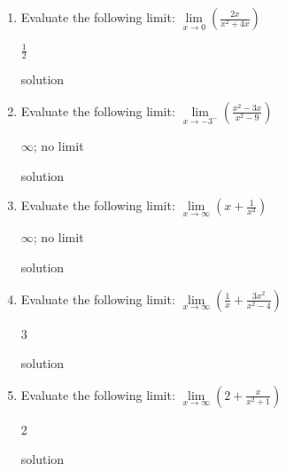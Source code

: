 \begin{enumerate}[leftmargin=*]
\vspace{0.325in}

\item Evaluate the following limit: \(\lim\limits_{x \to 0} \displaystyle \left(\frac{2x}{x^2+4x}\right)\)
    \begin{sol}
    $\frac{1}{2}$
    \end{sol}
    \begin{solL}
    solution
    \end{solL}

\vspace{0.325in}

\item Evaluate the following limit: \(\lim\limits_{x \to -3^-} \displaystyle \left(\frac{x^2-3x}{x^2-9}\right)\)
    \begin{sol}
    $\infty$; no limit
    \end{sol}
    \begin{solL}
    solution
    \end{solL}

\vspace{0.325in}

\item Evaluate the following limit: \(\lim\limits_{x \to \infty} \displaystyle \left(x+\frac{1}{x^2}\right)\)
    \begin{sol}
    $\infty$; no limit
    \end{sol}
    \begin{solL}
    solution
    \end{solL}

\vspace{0.325in}

\item Evaluate the following limit: \(\lim\limits_{x \to \infty} \displaystyle \left(\frac{1}{x}+\frac{3x^2}{x^2-4}\right)\)
    \begin{sol}
     3
    \end{sol}
    \begin{solL}
    solution
    \end{solL}


\vspace{0.325in}

\item Evaluate the following limit: \(\lim\limits_{x \to \infty} \displaystyle \left(2+\frac{x}{x^2+1}\right)\)
    \begin{sol}
    2
    \end{sol}
    \begin{solL}
    solution
    \end{solL}

\vspace{0.325in}

\end{enumerate}

